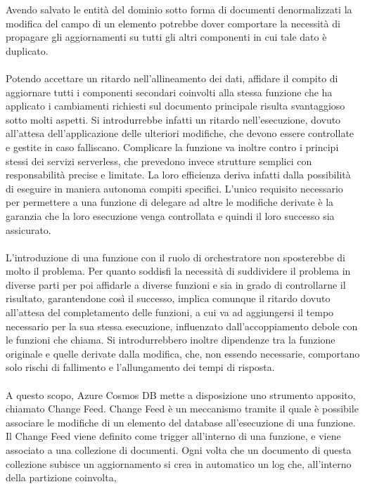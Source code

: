 Avendo salvato le entità del dominio sotto forma di documenti denormalizzati
la modifica del campo di un elemento potrebbe dover comportare la necessità
di propagare gli aggiornamenti su tutti gli altri componenti in cui tale dato è duplicato.\\
\\
Potendo accettare un ritardo nell'allineamento dei dati,
affidare il compito di aggiornare tutti i componenti secondari coinvolti
alla stessa funzione che ha applicato i cambiamenti richiesti sul documento principale
risulta svantaggioso sotto molti aspetti.
Si introdurrebbe infatti un ritardo nell'esecuzione,
dovuto all'attesa dell'applicazione delle ulteriori modifiche,
che devono essere controllate e gestite in caso falliscano.
Complicare la funzione va inoltre contro i principi stessi
dei servizi serverless,
che prevedono invece strutture semplici con responsabilità precise e limitate.
La loro efficienza deriva infatti dalla possibilità
di eseguire in maniera autonoma compiti specifici.
L'unico requisito necessario per permettere a una funzione di delegare ad altre le modifiche derivate
è la garanzia che la loro esecuzione venga controllata e quindi il loro successo sia assicurato.\\
\\
L'introduzione di una funzione con il ruolo di orchestratore
non sposterebbe di molto il problema.
Per quanto soddisfi la necessità di suddividere il problema in diverse parti
per poi affidarle a diverse funzioni e sia in grado di controllarne il risultato,
garantendone così il successo,
implica comunque il ritardo dovuto all'attesa del completamento delle funzioni,
a cui va ad aggiungersi il tempo necessario per la sua stessa esecuzione,
influenzato dall'accoppiamento debole con le funzioni che chiama.
Si introdurrebbero inoltre dipendenze tra la funzione originale e
quelle derivate dalla modifica, che, non essendo necessarie,
comportano solo rischi di fallimento e l'allungamento dei tempi di risposta.\\
\\
A questo scopo, Azure Cosmos DB mette a disposizione uno strumento apposito, chiamato Change Feed.
Change Feed è un meccanismo tramite il quale è possibile
associare le modifiche di un elemento del database
all'esecuzione di una funzione.
Il Change Feed viene definito come trigger all'interno di una funzione,
e viene associato a una collezione di documenti.
Ogni volta che un documento di questa collezione subisce un aggiornamento
si crea in automatico un log che,
all'interno della partizione coinvolta,
